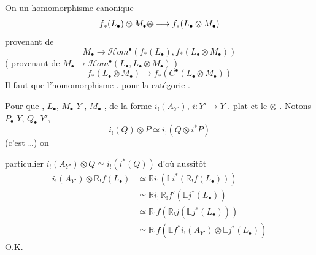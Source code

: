 \documentclass[11pt,a4paper]{article}
\begin{document}
On  \ill{} un homomorphisme canonique
\[
  f_{*}(L_{\bullet}) \otimes M_{\bullet} \text{\struck{$\otimes$}} \longrightarrow f_{*}(L_{\bullet} \otimes M_{\bullet})
\]
provenant de
\[
  M_{\bullet} \longrightarrow \mathcal{H}om^{\bullet}(f_{*}(L_{\bullet}), f_{*}(L_{\bullet} \otimes M_{\bullet}))
\]
( provenant de $M_{\bullet} \to \mathcal{H}om^{\bullet}(L_{\bullet}, L_{\bullet} \otimes M_{\bullet})$ \emph{\ill{} \ill{}}) \ill{} \ill{} 
\[
  f_{*}(L_{\bullet} \otimes M_{\bullet}) \longrightarrow f_{*}(C^{\bullet}(L_{\bullet} \otimes M_{\bullet}))
\]
Il faut  que l'homomorphisme \ill{} \ill{}. \ill{} \ill{} \ill{}  pour la catégorie . \struck{\ill{} \ill{} \ill{}}

Pour  que \ill{} \ill{} \ill{} \ill{}, \ill{} \ill{} \ill{} \ill{} $L_{\bullet}$, $M_{\bullet}$ \ill{} $Y$-,  \ill{} \ill{} \ill{} $M_{\bullet}$ \ill{}, \ill{} \ill{} \ill{} \ill{} de la forme $i_{!}(A_{Y'})$, \ill{} $i : Y' \to Y$ \ill{} \ill{} \ill{} \ill{}. \ill{} \ill{} plat et le $\otimes$  . Notons \ill{} \ill{} \ill{} $P_{\bullet}$ \ill{} $Y$, \ill{} $Q_{\bullet}$ \ill{} $Y'$,
\[
  i_{!}(Q) \otimes P \simeq i_{!}(Q \otimes i^{*}P)
\]
(c'est \ill{} \ill{} \ill{}   …) on



particulier $i_{!}(A_{Y'}) \otimes Q \simeq i_{!}(i^{*}(Q))$ d'où aussitôt
\begin{align*}
  i_{!}(A_{Y'}) \otimes \mathbb{R}_{!}f(L_{\bullet})
  &\simeq \mathbb{R}i_{!}(\mathbb{L}i^{*}(\mathbb{R}_{!}f(L_{\bullet}))) \\
  &\simeq \mathbb{R}i_{!}\, \mathbb{R}_{!}f'(\mathbb{L}j^{*}(L_{\bullet})) \\
  &\simeq \mathbb{R}_{!}f(\mathbb{R}_{!}j(\mathbb{L}j^{*}(L_{\bullet}))) \\
  &\simeq \mathbb{R}_{!}f(\mathbb{L}f^{*}i_{!}(A_{Y'}) \otimes \mathbb{L}j^{*}(L_{\bullet}))
\end{align*}
O.K.
\end{document}
